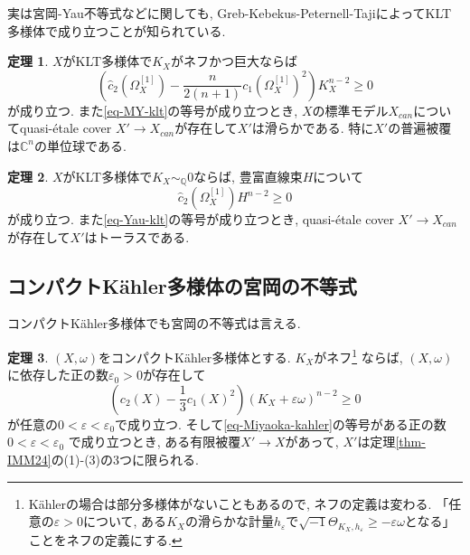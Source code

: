 \documentclass[dvipdfmx]{msjproc}
\theoremstyle{definition}
\newtheorem{thm}{定理}[section]
\newcommand{\C}{\mathbb{C}}
\newcommand{\Q}{\mathbb{Q}}
\begin{document}
実は宮岡-Yau不等式などに関しても, Greb-Kebekus-Peternell-TajiによってKLT多様体で成り立つことが知られている.  
\begin{thm}\cite{GKPT19b}\cite{GKPT20}
$X$がKLT多様体で$K_X $がネフかつ巨大ならば
\begin{equation}
\label{eq-MY-klt}
\left(\widehat{c}_2(\Omega_{X}^{[1]}) - \frac{n}{2(n+1)}c_1(\Omega_{X}^{[1]})^{2} \right) K_{X}^{n-2}\ge 0
\end{equation}
が成り立つ. 
また\eqref{eq-MY-klt}の等号が成り立つとき, $X$の標準モデル$X_{can}$についてquasi-\'etale cover $X' \to X_{can}$が存在して$X'$は滑らかである. 特に$X'$の普遍被覆は$\C^n$の単位球である. 
\end{thm}


\begin{thm}\cite{GKP16}\cite{LT18}
$X$がKLT多様体で$K_X \sim_{\Q}0$ならば, 豊富直線束$H$について
\begin{equation}
\label{eq-Yau-klt}
\widehat{c}_2(\Omega_{X}^{[1]}) H^{n-2} \ge 0
\end{equation}
が成り立つ. また\eqref{eq-Yau-klt}の等号が成り立つとき, quasi-\'etale cover $X' \to X_{can}$が存在して$X'$はトーラスである.  
\end{thm}

\subsection{コンパクトK\"ahler多様体の宮岡の不等式}

コンパクトK\"ahler多様体でも宮岡の不等式は言える.

\begin{thm}\cite{IM22}\cite{Iwa25}
$(X,\omega)$をコンパクトK\"ahler多様体とする. 
$K_X$がネフ\footnote{K\"ahlerの場合は部分多様体がないこともあるので, ネフの定義は変わる. 「任意の$\varepsilon >0$について, ある$K_X$の滑らかな計量$h_{\varepsilon}$で$\sqrt{-1}\Theta_{K_X, h_{\varepsilon}} \ge - \varepsilon \omega$となる」ことをネフの定義にする. }
ならば, $(X, \omega)$に依存した正の数$\varepsilon_{0}>0$が存在して
\begin{equation}
\label{eq-Miyaoka-kahler}
\left(c_2(X) - \frac{1}{3}c_{1} (X)^2\right)(K_{X} + \varepsilon \omega)^{n-2}\ge 0
\end{equation}
が任意の$0 < \varepsilon < \varepsilon_{0}$で成り立つ. 
そして\eqref{eq-Miyaoka-kahler}の等号がある正の数$0 < \varepsilon < \varepsilon_{0}$
で成り立つとき, ある有限被覆$X' \to X$があって, $X'$は定理\ref{thm-IMM24}の(1)-(3)の3つに限られる. 
\end{thm}
\end{document}
